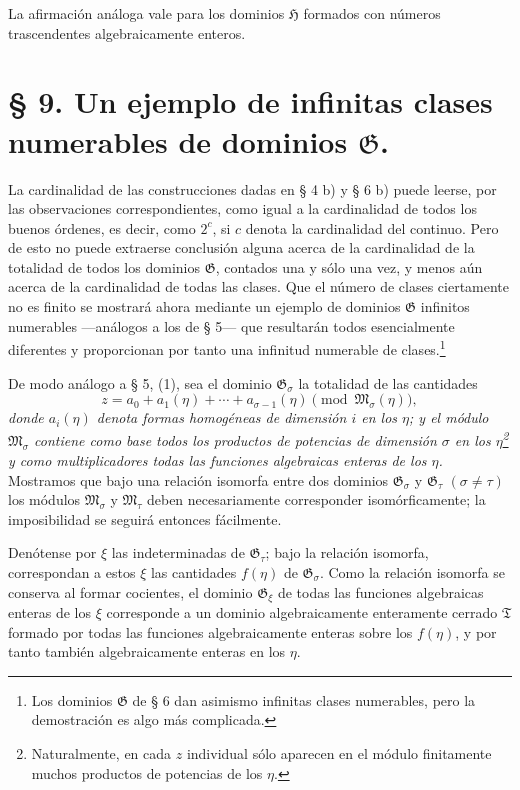 \documentclass[11pt]{article}
\begin{document}
La afirmación análoga vale para los dominios $\mathfrak H$ formados con números trascendentes algebraicamente enteros.

\section*{§ 9. Un ejemplo de infinitas clases numerables de dominios $\mathfrak G$.}

La cardinalidad de las construcciones dadas en § 4 b) y § 6 b) puede leerse, por las observaciones correspondientes, como igual a la cardinalidad de todos los buenos órdenes, es decir, como $2^c$, si $c$ denota la cardinalidad del continuo. Pero de esto no puede extraerse conclusión alguna acerca de la cardinalidad de la totalidad de todos los dominios $\mathfrak G$, contados una y sólo una vez, y menos aún acerca de la cardinalidad de todas las clases. Que el número de clases ciertamente no es finito se mostrará ahora mediante un ejemplo de dominios $\mathfrak G$ infinitos numerables ---análogos a los de § 5--- que resultarán todos esencialmente diferentes y proporcionan por tanto una infinitud numerable de clases.\footnote{Los dominios $\mathfrak G$ de § 6 dan asimismo infinitas clases numerables, pero la demostración es algo más complicada.}

De modo análogo a § 5, (1), sea el dominio $\mathfrak G_\sigma$ la totalidad de las cantidades
\begin{equation}
 z=a_0+a_1(\eta)+\cdots+a_{\sigma-1}(\eta)
 \pmod{\mathfrak M_\sigma(\eta)},
\tag{1}
\end{equation}
\emph{donde $a_i(\eta)$ denota formas homogéneas de dimensión $i$ en los $\eta$; y el módulo $\mathfrak M_\sigma$ contiene como base todos los productos de potencias de dimensión $\sigma$ en los $\eta$\footnote{Naturalmente, en cada $z$ individual sólo aparecen en el módulo finitamente muchos productos de potencias de los $\eta$.} y como multiplicadores todas las funciones algebraicas enteras de los $\eta$.} Mostramos que bajo una relación isomorfa entre dos dominios $\mathfrak G_\sigma$ y $\mathfrak G_\tau$ $(\sigma\ne\tau)$ los módulos $\mathfrak M_\sigma$ y $\mathfrak M_\tau$ deben necesariamente corresponder isomórficamente; la imposibilidad se seguirá entonces fácilmente.

Denótense por $\xi$ las indeterminadas de $\mathfrak G_\tau$; bajo la relación isomorfa, correspondan a estos $\xi$ las cantidades $f(\eta)$ de $\mathfrak G_\sigma$. Como la relación isomorfa se conserva al formar cocientes, el dominio $\mathfrak G_\xi$ de todas las funciones algebraicas enteras de los $\xi$ corresponde a un dominio algebraicamente enteramente cerrado $\mathfrak T$ formado por todas las funciones algebraicamente enteras sobre los $f(\eta)$, y por tanto también algebraicamente enteras en los $\eta$.
\end{document}
